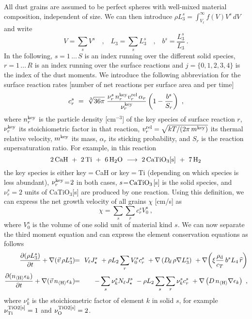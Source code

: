 \documentclass[11pt]{article}
\def\nH{n_{\langle\rm H\rangle}}
\def\Vl{V_{\ell}}
\def\Nl{N_{\ell}}
\def\rhod{\rho_{\rm d}}
\def\ek{\epsilon_k}
\def\pdiff#1#2{\frac{\partial #1}{\partial #2}}
\def\Dd{D_{\!d}}
\begin{document}
All dust grains are assumed to be perfect spheres with
well-mixed material composition, independent of size.
We can then introduce $\rho L_3^s=\int_{V_\ell}^\infty f(V)V^s\,dV$
\citep{Helling2008} and write
\begin{equation}
  V = \sum\limits_s V^s \quad\mbox{,}\quad
  L_3 = \sum\limits_s L_3^s \quad\mbox{,}\quad
  b^s = \frac{L_3^s}{L_3}  \ .
\end{equation}
In the following, $s=1\,...\,S$ is an index running over the
different solid species, $r=1\,...\,R$ is an index running over the 
surface reactions and $j=\{0,1,2,3,4\}$ is the index of the dust moments.
We introduce the following abbreviation for the surface reaction rates
[number of net reactions per surface area and per time]
\begin{equation}
  c_r^s ~=~ \sqrt[3]{36\pi}\;
          \frac{\nu_r^s\,n_r^{\rm key}v_r^{\rm rel}\,\alpha_r}{\nu_r^{\rm key}}
          \left(1-\frac{b^s}{S_r}\right) \ ,
\end{equation}
where $n_r^{\rm key}$ is the particle density [cm$^{-3}$] of the key
species of surface reaction $r$, $\nu_r^{\rm key}$ its stoichiometric
factor in that reaction, $v_r^{\rm rel}=\sqrt{kT/(2\pi\,m^{\rm key})}$
its thermal relative velocity, $m^{\rm key}$ its mass, $\alpha_r$ its
sticking probability, and $S_r$ is the reaction supersaturation
ratio. For example, in this reaction
\begin{equation}
 \rm 2\,CaH ~+~ 2\,Ti ~+~ 6\,H_2O ~\longrightarrow~ 2\,CaTiO_3[s] ~+~ 7\,H_2
\end{equation}
the key species is either key$=$CaH or key$=$Ti (depending on which
species is less abundant), $\nu_r^{\rm key}\!=\!2$ in both cases,
$s\!=\rm\!CaTiO_3$[s] is the solid species, and $\nu_r^s\!=\!2$ units
of CaTiO$_3$[s] are produced by one reaction. Using this definition,
we can express the net growth velocity of all grains $\chi$ [cm/s] as
\begin{equation}
  \chi = \sum\limits_s \sum\limits_r c_r^s V_0^s \ ,
\end{equation}
where $V_0^s$ is the volume of one solid unit of material kind $s$.
We can now separate the third moment equation and can express the 
element conservation equations as follows
\begin{eqnarray}
  \pdiff{(\rho L_3^s)}{t} + \nabla(\vec{v}\,\rho L_3^s) 
  &\!\!=\!\!& \Vl J_\star^s 
    ~+ \rho L_2 \sum\limits_r V_0^s c_r^s  
    ~+ \nabla\left(\Dd\,\rho\nabla L_3^s\right)
    ~+ \nabla\!\left(\xi\frac{\rhod}{c_T}\,b^s L_4\,\widehat{r}\right)\\
  \pdiff{(\nH\ek)}{t} + \nabla(\vec{v}\,\nH\ek)
  &\!\!=\!\!& -\sum\limits_s \nu_k^s \Nl J_\star^s 
    ~- \rho L_2 \sum\limits_s\sum\limits_r \nu_k^s c_r^s 
    ~+ \nabla\left(D\,\nH\nabla \ek\right)  \ ,
\end{eqnarray}
where $\nu_k^s$ is the stoichiometric factor of element $k$ in solid
$s$, for example $\nu_{\rm Ti}^{\rm TiO2[s]}=1$ and $\nu_{\rm O}^{\rm
  TiO2[s]}=2$. 
\end{document}
